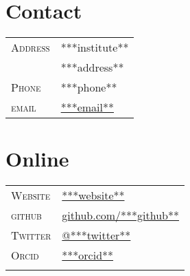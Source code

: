\documentclass[10pt]{article}
\begin{document}
\pagestyle{empty}


\par{\bigskip\par}



\begin{multicols}{2}
\setlength{\parskip}{0pt}
  \section{Contact}

\begin{tabularx}{\linewidth}{@{}l X@{}}
  \textsc{Address} & \small{***institute**} \\
                   & \small{***address**} \\
  \textsc{Phone}   & \small{***phone**}\\
  \textsc{email}   & \href{mailto:***email**}{***email**} \\
\end{tabularx}

\vfill
\columnbreak

\section{Online}
\begin{tabularx}{\linewidth}{@{}l X@{}}
  \textsc{Website}  & \href{***websiteescaped**}{***website**} \\
  \textsc{github}   & \href{http://www.github.com/***github**}{github.com/***github**}\\
  \textsc{Twitter}  & \href{https://twitter.com/***twitter**}{@***twitter**} \\
  \textsc{Orcid}    & \href{http://orcid.org/***orcid**}{***orcid**} \\
  \\
\end{tabularx}

\end{multicols}
\end{document}
